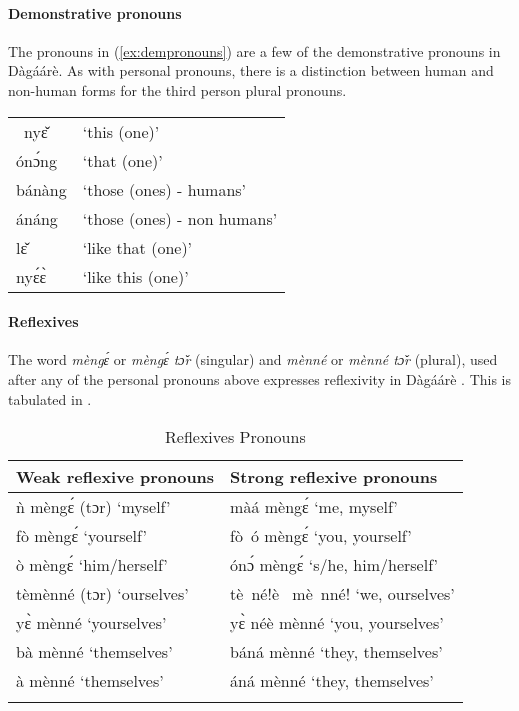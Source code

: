 \paragraph{ Demonstrative pronouns}

The pronouns in (\ref{ex:dempronouns}) are a few of the demonstrative pronouns in Dàgáárè. As
with personal pronouns, there is a distinction between human and non-human forms for the
third person plural pronouns.

\ea \label{ex:dempronouns} \begin{tabular}{ll} \ nyɛ̌& ‘this (one)’\\
ónɔ́ng& ‘that (one)’\\
bánàng &‘those (ones) - humans’\\
ánáng &‘those (ones) - non humans’\\
lɛ̌ &‘like that (one)’\\
nyɛ́ɛ̀ &‘like this (one)’
\end{tabular}
\z 


\paragraph{ Reflexives}
The word \textit{mèngɛ́} or \textit{mèngɛ́ tɔ̌r} (singular) and \textit{mènné} or \textit{mènné tɔ̌r} (plural), used
after any of the personal pronouns above expresses reflexivity in Dàgáárè . This is tabulated
in .

\begin{table}[]
    \centering
    \begin{tabular}{ll}\lsptoprule
Weak reflexive pronouns &  Strong reflexive pronouns \\\midrule
ǹ mèngɛ́ (tɔr) ‘myself’     & màá mèngɛ́ ‘me, myself’\\
fò mèngɛ́  ‘yourself’&fò~ó mèngɛ́ ‘you, yourself’\\
ò mèngɛ́  ‘him/herself’ &  ónɔ́ mèngɛ́ ‘s/he, him/herself’\\
tèmènné (tɔr) ‘ourselves’ &    tè~né!è~ mè~nné! ‘we, ourselves'\\
yɛ̀ mènné ‘yourselves’& yɛ̀ néè mènné ‘you, yourselves'\\
bà mènné ‘themselves’& báná mènné ‘they, themselves’ \\
à mènné ‘themselves’&áná mènné ‘they, themselves’\\\lspbottomrule
    \end{tabular}
    \caption{Reflexives Pronouns}
    \label{tab:reflexives}
\end{table}  


